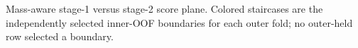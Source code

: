 Mass-aware stage-1 versus stage-2 score plane. Colored staircases are the independently selected inner-OOF boundaries for each outer fold; no outer-held row selected a boundary.

